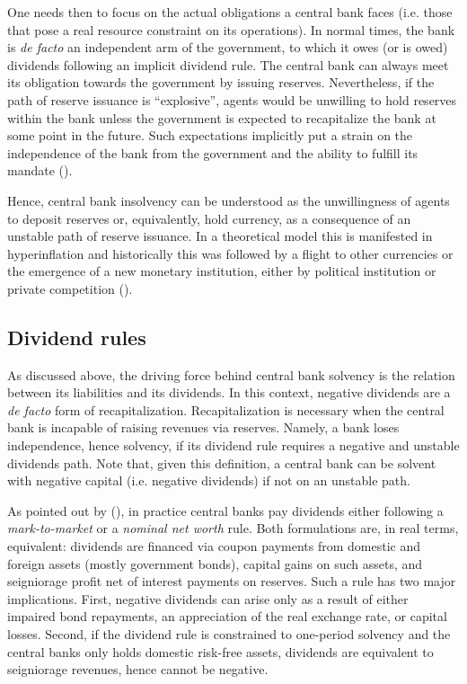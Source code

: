 \documentclass[american]{scrartcl}
\newcommand{\citein}[1]{\citeauthor{#1} (\citeyear{#1})}
\begin{document}
One needs then to focus on the actual obligations a central bank faces (i.e. those that pose a real resource constraint on its operations). In normal times, the bank is \textit{de facto} an independent arm of the government, to which it owes (or is owed) dividends following an implicit dividend rule. The central bank can always meet its obligation towards the government by issuing reserves. Nevertheless, if the path of reserve issuance is ``explosive'', agents would be unwilling to hold reserves within the bank unless the government is expected to recapitalize the bank at some point in the future. Such expectations implicitly put a strain on the independence of the bank from the government and the ability to fulfill its mandate (\cite{deHaan2016}).


Hence, central bank insolvency can be understood as the unwillingness of agents to deposit reserves or, equivalently, hold currency, as a consequence of an unstable path of reserve issuance. In a theoretical model this is manifested in hyperinflation and historically this was followed by a flight to other currencies or the emergence of a new monetary institution, either by political institution or private competition (\cite{Flandreau2007}). %

\subsection{Dividend rules}

As discussed above, the driving force behind central bank solvency is the relation between its liabilities and its dividends. In this context, negative dividends are a \textit{de facto} form of recapitalization. Recapitalization is necessary when the central bank is incapable of raising revenues via reserves. Namely, a bank loses independence, hence solvency, if its dividend rule requires a negative and unstable dividends path. Note that, given this definition, a central bank can be solvent with negative capital (i.e. negative dividends) if not on an unstable path.

As pointed out by \citein{Hall2015}, in practice central banks pay dividends either following a \textit{mark-to-market} or a \textit{nominal net worth} rule. Both formulations are, in real terms, equivalent: dividends are financed via coupon payments from domestic and foreign assets (mostly government bonds), capital gains on such assets, and seigniorage profit net of interest payments on reserves. Such a rule has two major implications. First, negative dividends can arise only as a result of either impaired bond repayments, an appreciation of the real exchange rate, or capital losses. Second, if the dividend rule is constrained to one-period solvency and the central banks only holds domestic risk-free assets, dividends are equivalent to seigniorage revenues, hence cannot be negative.
\end{document}
